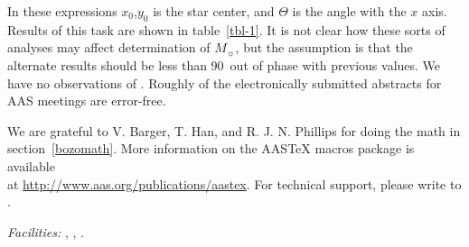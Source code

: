 \documentclass[manuscript]{aastex}
\begin{document}
In these expressions $x_{0}$,$y_{0}$ is the star center, and $\Theta$ is the
angle with the $x$ axis.  Results of this task are shown in table~\ref{tbl-1}.
It is not clear how these sorts of analyses may affect determination of
 $M_{\sun}$, but the assumption is that the alternate results
should be less than 90\degr\ out of phase with previous values.
We have no observations of .
Roughly  of the electronically submitted abstracts
for AAS meetings are error-free.



\acknowledgments

We are grateful to V. Barger, T. Han, and R. J. N. Phillips for
doing the math in section~\ref{bozomath}.
More information on the AASTeX macros package is available \\ at
\url{http://www.aas.org/publications/aastex}.
For technical support, please write to
.



{\it Facilities:} , , .
\end{document}
